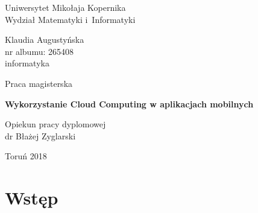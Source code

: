 \documentclass[12pt,a4paper,twoside,titlepage,openright]{book}
\begin{document}

\begin{titlepage}


\vspace*{1cm}
\begin{center}
\begin{Large}
Uniwersytet Mikołaja Kopernika\\[1mm]
Wydział Matematyki i~Informatyki\\[1mm]
\end{Large}
\end{center}

\vfill

\begin{center}
{\Large Klaudia Augustyńska}\\
nr albumu: 265408\\
informatyka
\end{center}

\vfill

\begin{center}
{\Large Praca magisterska}
\end{center}

\vspace{0.5cm}

\begin{center}
{\Huge \textbf{Wykorzystanie Cloud Computing w aplikacjach mobilnych}}
\end{center}

\vspace{2cm}
\hfill
\begin{minipage}{6.5cm}
Opiekun pracy dyplomowej\\
dr Błażej Zyglarski
\end{minipage}

\vfill

\begin{center}
Toruń 2018
\end{center}

\end{titlepage}

\clearpage{\pagestyle{empty}\cleardoublepage}

\tableofcontents
 
\chapter*{Wstęp}
\end{document}
